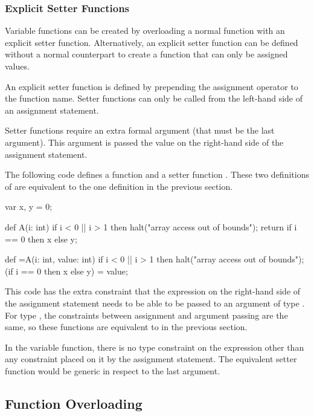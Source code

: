 \subsubsection{Explicit Setter Functions}
\label{Explicit_Setter_Functions}

Variable functions can be created by overloading a normal function
with an explicit setter function.  Alternatively, an explicit setter
function can be defined without a normal counterpart to create a
function that can only be assigned values.

An explicit setter function is defined by prepending the assignment
operator to the function name.  Setter functions can only be called
from the left-hand side of an assignment statement.

Setter functions require an extra formal argument (that must be the
last argument).  This argument is passed the value on the right-hand
side of the assignment statement.

\begin{example}
The following code defines a function  and a setter
function .  These two definitions of  are equivalent
to the one definition in the previous section.
\begin{chapel}
var x, y = 0;

def A(i: int) {
  if i < 0 || i > 1 then
    halt("array access out of bounds");
  return if i == 0 then x else y;
}

def =A(i: int, value: int) {
  if i < 0 || i > 1 then
    halt("array access out of bounds");
  (if i == 0 then x else y) = value;
}
\end{chapel}
This code has the extra constraint that the expression on the
right-hand side of the assignment statement needs to be able to be
passed to an argument of type .  For type , the
constraints between assignment and argument passing are the same, so
these functions are equivalent to in the previous section.

In the variable function, there is no type constraint on the
expression other than any constraint placed on it by the assignment
statement.  The equivalent setter function would be generic in respect
to the last argument.
\end{example}

\subsection{Function Overloading}
\label{Function_Overloading}

